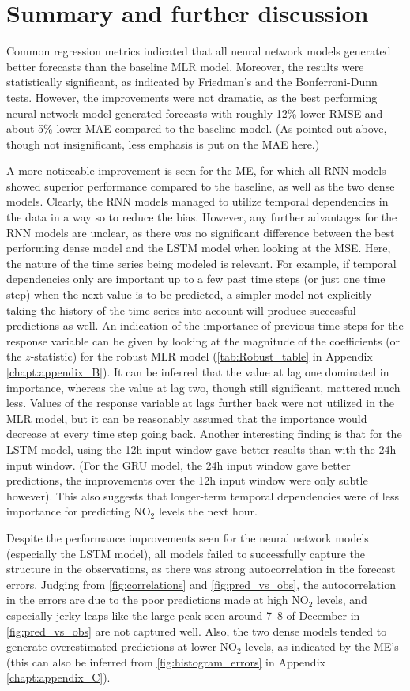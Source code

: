 \section{Summary and further discussion}
Common regression metrics indicated that all neural network models generated better forecasts than the baseline MLR model. Moreover, the results were statistically significant, as indicated by Friedman's and the Bonferroni-Dunn tests. However, the improvements were not dramatic, as the best performing neural network model generated forecasts with roughly 12\% lower RMSE and about 5\% lower MAE compared to the baseline model. (As pointed out above, though not insignificant, less emphasis is put on the MAE here.) 

A more noticeable improvement is seen for the ME, for which all RNN models showed superior performance compared to the baseline, as well as the two dense models. Clearly, the RNN models managed to utilize temporal dependencies in the data in a way so to reduce the bias. However, any further advantages for the RNN models are unclear, as there was no significant difference between the best performing dense model and the LSTM model when looking at the MSE. Here, the nature of the time series being modeled is relevant. For example, if temporal dependencies only are important up to a few past time steps (or just one time step) when the next value is to be predicted, a simpler model not explicitly taking the history of the time series into account will produce successful predictions as well. An indication of the importance of previous time steps for the response variable can be given by looking at the magnitude of the coefficients (or the $z$-statistic) for the robust MLR model (\cref{tab:Robust_table} in Appendix \ref{chapt:appendix_B}). It can be inferred that the value at lag one dominated in importance, whereas the value at lag two, though still significant, mattered much less. Values of the response variable at lags further back were not utilized in the  MLR model, but it can be reasonably assumed that the importance would decrease at every time step going back. Another interesting finding is that for the LSTM model, using the 12h input window gave better results than with the 24h input window. (For the GRU model, the 24h input window gave better predictions, the improvements over the 12h input window were only subtle however). This also suggests that longer-term temporal dependencies were of less importance for predicting NO$_2$ levels the next hour. 

Despite the performance improvements seen for the neural network models (especially the LSTM model), all models failed to successfully capture the structure in the observations, as there was strong autocorrelation in the forecast errors. Judging from \cref{fig:correlations} and \cref{fig:pred_vs_obs}, the autocorrelation in the errors are due to the poor predictions made at high NO$_2$ levels, and especially jerky leaps like the large peak seen around 7--8 of December in \cref{fig:pred_vs_obs} are not captured well. Also, the two dense models tended to generate overestimated predictions at lower NO$_2$ levels, as indicated by the ME's (this can also be inferred from \cref{fig:histogram_errors} in Appendix \ref{chapt:appendix_C}).

